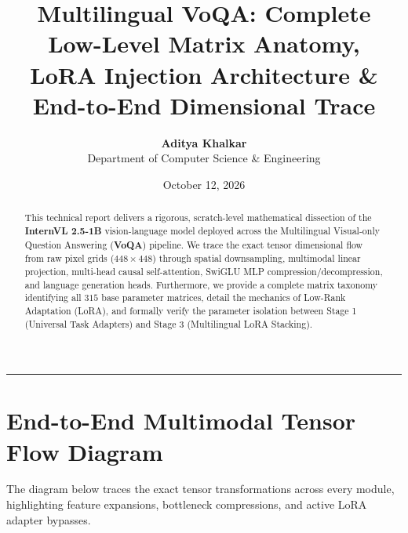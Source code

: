 \documentclass[11pt, a4paper]{article}
\title{\vspace{-1.5cm}\textbf{\Large Multilingual VoQA: Complete Low-Level Matrix Anatomy, \\ LoRA Injection Architecture \& End-to-End Dimensional Trace}}
\author{\textbf{Aditya Khalkar} \\ Department of Computer Science \& Engineering}
\date{October 12, 2026}
\begin{document}
\maketitle

\begin{abstract}
This technical report delivers a rigorous, scratch-level mathematical dissection of the \textbf{InternVL 2.5-1B} vision-language model deployed across the Multilingual Visual-only Question Answering (\textbf{VoQA}) pipeline. We trace the exact tensor dimensional flow from raw pixel grids ($448 \times 448$) through spatial downsampling, multimodal linear projection, multi-head causal self-attention, SwiGLU MLP compression/decompression, and language generation heads. Furthermore, we provide a complete matrix taxonomy identifying all $315$ base parameter matrices, detail the mechanics of Low-Rank Adaptation (LoRA), and formally verify the parameter isolation between Stage 1 (Universal Task Adapters) and Stage 3 (Multilingual LoRA Stacking).
\end{abstract}

\tableofcontents
\vspace{0.5cm}
\hrule
\vspace{0.5cm}

\section{End-to-End Multimodal Tensor Flow Diagram}
The diagram below traces the exact tensor transformations across every module, highlighting feature expansions, bottleneck compressions, and active LoRA adapter bypasses.
\end{document}
